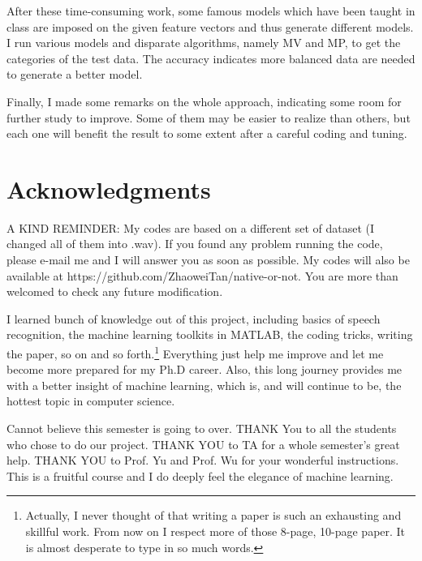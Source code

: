 \documentclass{sig-alternate}
\begin{document}
After these time-consuming work, some famous models which have been taught in class are imposed on the given feature vectors and thus generate different models. I run various models and disparate algorithms, namely MV and MP, to get the categories of the test data. The accuracy indicates more balanced data are needed to generate a better model.

Finally, I made some remarks on the whole approach, indicating some room for further study to improve. Some of them may be easier to realize than others, but each one will benefit the result to some extent after a careful coding and tuning.

\section{Acknowledgments}
A KIND REMINDER: My codes are based on a different set of dataset (I changed all of them into .wav). If you found any problem running the code, please e-mail me and I will answer you as soon as possible. My codes will also be available at https://github.com/ZhaoweiTan/native-or-not. You are more than welcomed to check any future modification.

I learned bunch of knowledge out of this project, including basics of speech recognition, the machine learning toolkits in MATLAB, the coding tricks, writing the paper, so on and so forth.\footnote{Actually, I never thought of that writing a paper is such an exhausting and skillful work. From now on I respect more of those 8-page, 10-page paper. It is almost desperate to type in so much words.} Everything just help me improve and let me become more prepared for my Ph.D career. Also, this long journey provides me with a better insight of machine learning, which is, and will continue to be, the hottest topic in computer science.

Cannot believe this semester is going to over. THANK You to all the students who chose to do our project. THANK YOU to TA for a whole semester's great help. THANK YOU to Prof. Yu and Prof. Wu for your wonderful instructions. This is a fruitful course and I do deeply feel the elegance of machine learning.

%

%
%
\end{document}
